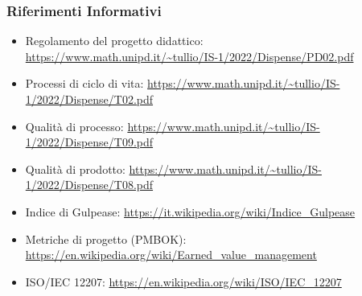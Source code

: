 \subsubsection{Riferimenti Informativi}
\begin{itemize}
    \item Regolamento del progetto didattico:\\ \url{https://www.math.unipd.it/~tullio/IS-1/2022/Dispense/PD02.pdf}
    \item Processi di ciclo di vita: \url{https://www.math.unipd.it/~tullio/IS-1/2022/Dispense/T02.pdf}
    \item Qualità di processo: \url{https://www.math.unipd.it/~tullio/IS-1/2022/Dispense/T09.pdf}
    \item Qualità di prodotto: \url{https://www.math.unipd.it/~tullio/IS-1/2022/Dispense/T08.pdf}
    \item Indice di Gulpease: \url{https://it.wikipedia.org/wiki/Indice_Gulpease}
    \item Metriche di progetto (PMBOK): \url{https://en.wikipedia.org/wiki/Earned_value_management}
    \item ISO/IEC 12207: \url{https://en.wikipedia.org/wiki/ISO/IEC_12207}
\end{itemize}

